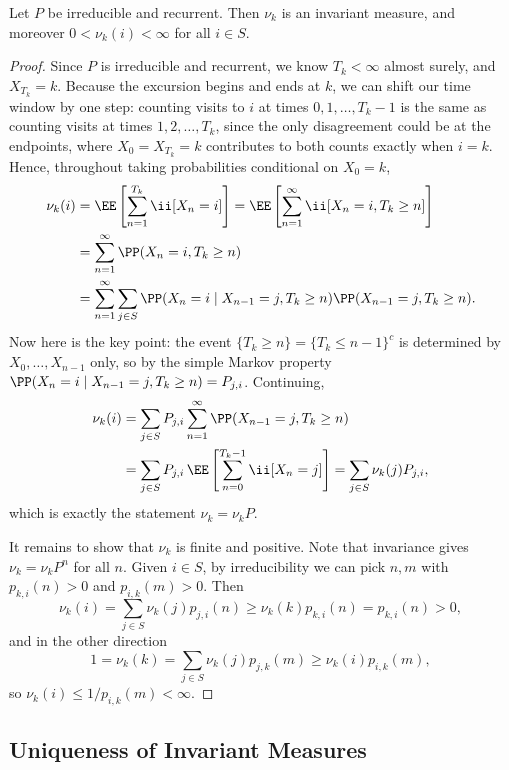 \begin{theorem}
	Let $P$ be irreducible and recurrent. Then $\nu_k$ is an invariant measure, and moreover $0 < \nu_k(i) < \infty$ for all $i \in S$.
\end{theorem}
\begin{proof}
	Since $P$ is irreducible and recurrent, we know $T_k < \infty$ almost surely, and $X_{T_k} = k$. Because the excursion begins and ends at $k$, we can shift our time window by one step: counting visits to $i$ at times $0, 1, \dots, T_k - 1$ is the same as counting visits at times $1, 2, \dots, T_k$, since the only disagreement could be at the endpoints, where $X_0 = X_{T_k} = k$ contributes to both counts exactly when $i = k$. Hence, throughout taking probabilities conditional on $X_0 = k$,
	\begin{align*}
		\nu_k(i) &= \EE\left[\sum_{n = 1}^{T_k} \ii[X_n = i]\right] = \EE\left[\sum_{n = 1}^{\infty} \ii[X_n = i, T_k \geq n]\right] \\
		&= \sum_{n = 1}^{\infty} \PP(X_n = i, T_k \geq n) \\
		&= \sum_{n = 1}^{\infty} \sum_{j \in S} \PP(X_n = i \mid X_{n - 1} = j, T_k \geq n)\PP(X_{n - 1} = j, T_k \geq n).
	\end{align*}
	Now here is the key point: the event $\{T_k \geq n\} = \{T_k \leq n - 1\}^c$ is determined by $X_0, \dots, X_{n - 1}$ only, so by the simple Markov property $\PP(X_n = i \mid X_{n - 1} = j, T_k \geq n) = P_{j, i}$. Continuing,
	\begin{align*}
		\nu_k(i) &= \sum_{j \in S} P_{j, i} \sum_{n = 1}^{\infty} \PP(X_{n - 1} = j, T_k \geq n) \\
		&= \sum_{j \in S} P_{j, i}\, \EE\left[\sum_{n = 0}^{T_k - 1} \ii[X_n = j]\right] = \sum_{j \in S} \nu_k(j) P_{j, i},
	\end{align*}
	which is exactly the statement $\nu_k = \nu_k P$.

	It remains to show that $\nu_k$ is finite and positive. Note that invariance gives $\nu_k = \nu_k P^n$ for all $n$. Given $i \in S$, by irreducibility we can pick $n, m$ with $p_{k, i}(n) > 0$ and $p_{i, k}(m) > 0$. Then
	$$
	\nu_k(i) = \sum_{j \in S} \nu_k(j) p_{j, i}(n) \geq \nu_k(k)p_{k, i}(n) = p_{k, i}(n) > 0,
	$$
	and in the other direction
	$$
	1 = \nu_k(k) = \sum_{j \in S} \nu_k(j) p_{j, k}(m) \geq \nu_k(i)p_{i, k}(m),
	$$
	so $\nu_k(i) \leq 1/p_{i, k}(m) < \infty$.
\end{proof}

\subsection{Uniqueness of Invariant Measures}

